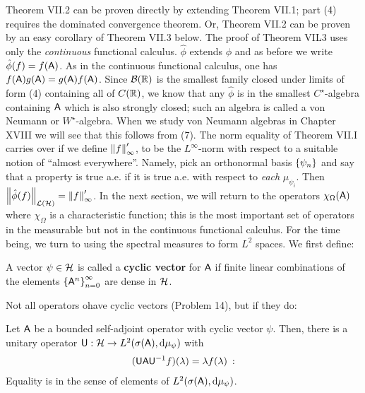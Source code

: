 Theorem VII.2 can be proven directly by extending Theorem VII.1; part (4) requires the dominated convergence theorem. Or, Theorem VII.2 can be proven by an easy corollary of Theorem VII.3 below. The proof of Theorem VIL3 uses only the \textit{continuous} functional calculus. $\hat \phi$ extends $\phi$ and as before we write $\hat \phi (f) = f(\mathsf{A})$. As in the continuous functional calculus, one has $f(\mathsf{A}) g(\mathsf{A}) = g(\mathsf{A}) f(\mathsf{A})$.
Since $\mathcal B (\mathbb{R})$ is the smallest family closed under limits of form (4) containing all of $C(\mathbb{R})$, we know that any $\hat \phi$ is in the smallest $C^\star$-algebra containing $\mathsf{A}$ which is also strongly closed; such an algebra is called a von Neumann or $W^\star$-algebra. When we study von Neumann algebras in Chapter XVIII we will see that this follows from (7).
The norm equality of Theorem VII.I carries over if we define $\left \Vert f \right \Vert_\infty '$, to be the $L^\infty$-norm with respect to a suitable notion of \enquote{almost everywhere}. Namely, pick an orthonormal basis $\left \lbrace \psi_n \right \rbrace$ and say that a property is true a.e. if it is true a.e. with respect to \textit{each} $\mu_{\psi_i}$. Then $\left \Vert  \hat \phi (f) \right \Vert_{\mathcal L(\mathcal{H})} =\left \Vert f \right \Vert_\infty '$.
In the next section, we will return to the operators $\chi_\Omega (\mathsf{A})$ where $\chi_\Omega$ is a characteristic function; this is the most important set of operators in the measurable but not in the continuous functional calculus. For the time being, we turn to using the spectral measures to form $L^2$ spaces. We first define:

\begin{definition}
    A vector $\psi \in \mathcal{H}$ is called a \textbf{cyclic vector} for $\mathsf{A}$ if finite linear combinations of the elements $\left \lbrace \mathsf{A}^n \right \rbrace_{n=0}^\infty$ are dense in $\mathcal{H}$.
\end{definition}

Not all operators ohave cyclic vectors (Problem 14), but if they do:

\begin{lemma}
    Let $\mathsf{A}$ be a bounded self-adjoint operator with cyclic vector $\psi$. Then, there is a unitary operator $\mathsf{U}: \mathcal{H} \to L^{2}(\sigma(\mathsf{A}), \mathrm{d} \mu_\psi)$ with \begin{align}
        (\mathsf{U} \mathsf{A} \mathsf{U}^{-1} f) (\lambda) = \lambda f(\lambda) \::
    \end{align}
    Equality is in the sense of elements of $L^{2}(\sigma(\mathsf{A}), \mathrm{d} \mu_\psi)$.
\end{lemma}

